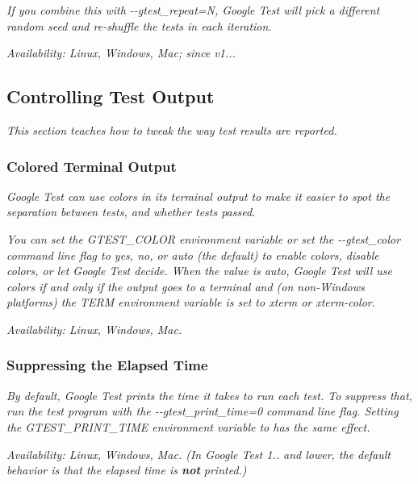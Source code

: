 {\itshape If you combine this with {\ttfamily -\/-\/gtest\+\_\+repeat=N}, Google Test will pick a different random seed and re-\/shuffle the tests in each iteration.}

{\itshape {\itshape Availability\+:} Linux, Windows, Mac; since v1...}

{\itshape \subsection*{Controlling Test Output}}

{\itshape }

{\itshape This section teaches how to tweak the way test results are reported.}

{\itshape \subsubsection*{Colored Terminal Output}}

{\itshape }

{\itshape Google Test can use colors in its terminal output to make it easier to spot the separation between tests, and whether tests passed.}

{\itshape You can set the G\+T\+E\+S\+T\+\_\+\+C\+O\+L\+OR environment variable or set the {\ttfamily -\/-\/gtest\+\_\+color} command line flag to {\ttfamily yes}, {\ttfamily no}, or {\ttfamily auto} (the default) to enable colors, disable colors, or let Google Test decide. When the value is {\ttfamily auto}, Google Test will use colors if and only if the output goes to a terminal and (on non-\/\+Windows platforms) the {\ttfamily T\+E\+RM} environment variable is set to {\ttfamily xterm} or {\ttfamily xterm-\/color}.}

{\itshape {\itshape Availability\+:} Linux, Windows, Mac.}

{\itshape \subsubsection*{Suppressing the Elapsed Time}}

{\itshape }

{\itshape By default, Google Test prints the time it takes to run each test. To suppress that, run the test program with the {\ttfamily -\/-\/gtest\+\_\+print\+\_\+time=0} command line flag. Setting the {\ttfamily G\+T\+E\+S\+T\+\_\+\+P\+R\+I\+N\+T\+\_\+\+T\+I\+ME} environment variable to {} has the same effect.}

{\itshape {\itshape Availability\+:} Linux, Windows, Mac. (In Google Test 1.. and lower, the default behavior is that the elapsed time is {\bfseries not} printed.)}

